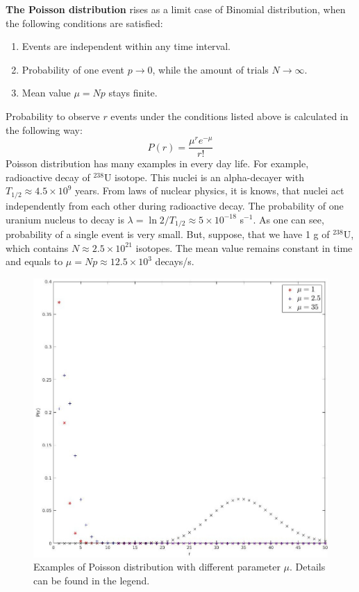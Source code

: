 \documentclass[12pt,a4paper]{report}
\begin{document}
\newpage
\textbf{The Poisson distribution} rises as a limit case of Binomial distribution, when the following conditions are satisfied:
\begin{enumerate}
\item Events are independent within any time interval.
\item Probability of one event $p \rightarrow 0$, while the amount of trials $N \rightarrow \infty$. 
\item Mean value $\mu = Np$ stays finite.
\end{enumerate}
Probability to observe $r$ events under the conditions listed above is calculated in the following way:
\begin{equation} \label{poisson_dist}
P(r) = \frac{\mu^r e^{-\mu}}{r!}
\end{equation}
Poisson distribution has many examples in every day life. For example, radioactive decay of $^{238}$U isotope. This nuclei is an alpha-decayer with $T_{1/2} \approx 4.5 \times 10^9$ years. From laws of nuclear physics, it is knows, that nuclei act independently from each other during radioactive decay. The probability of one uranium nucleus to decay is $\lambda = \ln2 /T_{1/2} \approx 5 \times 10^{-18}$ s$^{-1}$. As one can see, probability of a single event is very small. But, suppose, that we have 1 g of $^{238}$U, which contains $N \approx 2.5 \times 10^{21}$ isotopes. The mean value remains constant in time and equals to $\mu = Np \approx 12.5 \times 10^3$ decays/s. \par 
\begin{figure}[!h]
\begin{center}
\includegraphics*[scale = 0.4]{Figures/Poisson}
\caption{\label{fig:Poisson} Examples of Poisson distribution with different parameter $\mu$. Details can be found in the legend.}
\end{center}
\end{figure}
\end{document}
